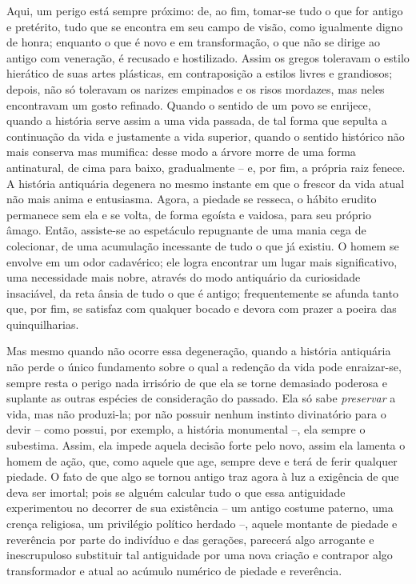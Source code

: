 Aqui, um perigo está sempre próximo: de, ao fim, tomar-se tudo o que for
antigo e pretérito, tudo que se encontra em seu campo de visão, como
igualmente digno de honra; enquanto o que é novo e em transformação, o
que não se dirige ao antigo com veneração, é recusado e hostilizado.
Assim os gregos toleravam o estilo hierático de suas artes plásticas, em
contraposição a estilos livres e grandiosos; depois, não só toleravam os
narizes empinados e os risos mordazes, mas neles encontravam um gosto
refinado. Quando o sentido de um povo se enrijece, quando a história
serve assim a uma vida passada, de tal forma que sepulta a continuação
da vida e justamente a vida superior, quando o sentido histórico não
mais conserva mas mumifica: desse modo a árvore morre de uma forma
antinatural, de cima para baixo, gradualmente -- e, por fim, a própria
raiz fenece. A história antiquária degenera no mesmo instante em que o
frescor da vida atual não mais anima e entusiasma. Agora, a piedade se
resseca, o hábito erudito permanece sem ela e se volta, de forma egoísta
e vaidosa, para seu próprio âmago. Então, assiste-se ao espetáculo
repugnante de uma mania cega de colecionar, de uma acumulação incessante
de tudo o que já existiu. O homem se envolve em um odor cadavérico; ele
logra encontrar um lugar mais significativo, uma necessidade mais nobre,
através do modo antiquário da curiosidade insaciável, da reta ânsia de
tudo o que é antigo; frequentemente se afunda tanto que, por fim, se
satisfaz com qualquer bocado e devora com prazer a poeira das
quinquilharias.

Mas mesmo quando não ocorre essa degeneração, quando a história
antiquária não perde o único fundamento sobre o qual a redenção da vida
pode enraizar-se, sempre resta o perigo nada irrisório de que ela se
torne demasiado poderosa e suplante as outras espécies de consideração
do passado. Ela só sabe \emph{preservar} a vida, mas não produzi-la; por
não possuir nenhum instinto divinatório para o devir -- como possui, por
exemplo, a história monumental --, ela sempre o subestima. Assim, ela
impede aquela decisão forte pelo novo, assim ela lamenta o homem de
ação, que, como aquele que age, sempre deve e terá de ferir qualquer
piedade. O fato de que algo se tornou antigo traz agora à luz a
exigência de que deva ser imortal; pois se alguém calcular tudo o que
essa antiguidade experimentou no decorrer de sua existência -- um antigo
costume paterno, uma crença religiosa, um privilégio político herdado
--, aquele montante de piedade e reverência por parte do indivíduo e das
gerações, parecerá algo arrogante e inescrupuloso substituir tal
antiguidade por uma nova criação e contrapor algo transformador e atual
ao acúmulo numérico de piedade e reverência.

